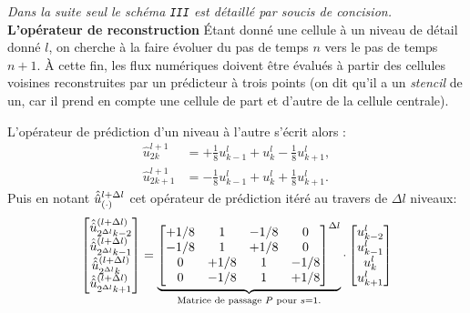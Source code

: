             \emph{Dans la suite seul le schéma \texttt{III} est détaillé par soucis de concision.}\\
            \textbf{L'opérateur de reconstruction}
            Étant donné une cellule à un niveau de détail donné $l$, on cherche à la faire évoluer du pas de temps $n$ vers le pas de temps $n+1$.
            À cette fin, les flux numériques doivent être évalués à partir des cellules voisines reconstruites par un 
            prédicteur à trois points (on dit qu'il a un \emph{stencil} de un, car il prend en compte une cellule de part et d'autre de la cellule centrale).\par
            L'opérateur de prédiction d'un niveau à l'autre s'écrit alors : 
            \begin{align}
                \hat u^{l+1}_{2k} &= +\frac{1}{8} u^l_{k-1} + u^l_k - \frac{1}{8} u^l_{k+1},\\
                \hat u^{l+1}_{2k+1} &= -\frac{1}{8} u^l_{k-1} + u^l_k + \frac{1}{8} u^l_{k+1}.
            \end{align}
            Puis en notant $\hat{\hat{u}}^{l+\Delta l}_{(\cdot)}$ cet opérateur de prédiction itéré au travers de $\Delta l$ niveaux:
            \begin{align}
                \begin{bmatrix}
                    \hat{\hat{u}}^{(l+\Delta l)}_{2^{\Delta l}k-2}\\
                    \hat{\hat{u}}^{(l+\Delta l)}_{2^{\Delta l}k-1}\\
                    \hat{\hat{u}}^{(l+\Delta l)}_{2^{\Delta l}k}\\
                    \hat{\hat{u}}^{(l+\Delta l)}_{2^{\Delta l}k+1}\\
                \end{bmatrix}
                    =
                \underbrace{
                \begin{bmatrix}
                    +1/8 & 1 & -1/8 & 0 \\
                    -1/8 & 1 & +1/8 & 0 \\
                    0 & +1/8 & 1 & -1/8 \\
                    0 & -1/8 & 1 & +1/8 
                \end{bmatrix}^{\Delta l}}_{\text{Matrice de passage } P \text{ pour }s=1.}
                \cdot
                \begin{bmatrix}
                    u^l_{k-2}\\
                    u^l_{k-1}\\
                    u^l_{k}\\
                    u^l_{k+1}\\
                \end{bmatrix}
            \end{align}
